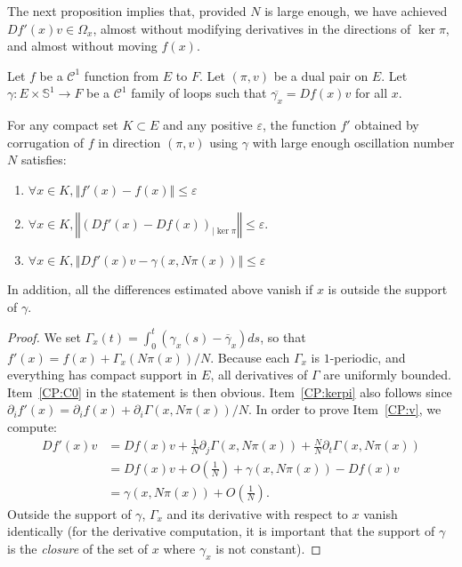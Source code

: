\documentclass[10pt,a4paper]{article}
\newcommand{\co}{\!:}
\newcommand{\bigO}[1]{O\left(#1\right)}
\newcommand{\uses}[1]{}
\newcommand{\lean}[1]{}
\newcommand{\leanok}{}
\begin{document}
The next proposition implies that, provided $N$ is large enough, we have
achieved $Df'(x)v ∈ Ω_x$, almost without modifying derivatives in the
directions of $\ker π$, and almost without moving $f(x)$.

\begin{proposition}[Theillière 2018]
  \label{prop:theilliere}
  \lean{fderiv_corrugated_map, corrugation.c0_small_on, remainder_c0_small_on, corrugation.support}\leanok
  \uses{def:corrugation}
  Let $f$ be a $\mathcal{C}^1$ function from $E$ to $F$. Let $(π, v)$ be a dual
  pair on $E$. Let $γ \co E × 𝕊^1 → F$ be a $\mathcal{C}^1$ family of loops
  such that $\overline{γ_x} = Df(x)v$ for all $x$.

  For any compact set $K ⊂ E$ and any positive $ε$, the function $f'$ obtained
  by corrugation of $f$ in direction $(π, v)$ using $γ$ with large enough
  oscillation number $N$ satisfies:
  \begin{enumerate}
    \item\label{CP:C0}
      $∀ x ∈ K, ‖f'(x) - f(x)‖ ≤ ε$
    \item\label{CP:kerpi}
      $∀ x ∈ K, ‖(Df'(x) - Df(x))_{|\ker π}‖ ≤ ε$.
    \item\label{CP:v}
      $∀ x ∈ K, ‖Df'(x)v - γ(x, Nπ(x))‖ ≤ ε$
  \end{enumerate}
  In addition, all the differences estimated above vanish if $x$ is outside the
  support of $γ$.
\end{proposition}

\begin{proof}
  \leanok
  We set $Γ_x(t) = ∫_0^t \left(γ_x(s) - \overline{γ}_x\right)ds$, so that
  $f'(x) = f(x) + Γ_x(Nπ(x))/N$.  Because each $Γ_x$ is $1$-periodic, and
  everything has compact support in $E$, all derivatives of $Γ$ are uniformly
  bounded.  Item~\ref{CP:C0} in the statement is then obvious.
  Item~\ref{CP:kerpi} also follows since
  $∂_if'(x) = ∂_if(x) + ∂_iΓ(x, Nπ(x))/N$. In order to prove
  Item~\ref{CP:v}, we compute:
  \begin{align*}
      Df'(x)v &= Df(x)v + \frac1N ∂_jΓ(x, Nπ(x)) + \frac NN ∂_tΓ(x, Nπ(x))\\
                       &= Df(x)v + \bigO{\frac1N} + γ(x, Nπ(x)) - Df(x)v\\
                       &= γ(x, Nπ(x)) + \bigO{\frac1N}.
  \end{align*}
  Outside the support of $γ$, $Γ_x$ and its derivative with respect to $x$
  vanish identically (for the derivative computation, it is important that the
  support of $γ$ is the \emph{closure} of the set of $x$ where $γ_x$ is not
  constant).
\end{proof}
\end{document}
